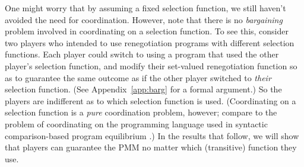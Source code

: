 \documentclass[sigconf]{aamas}
\theoremstyle{definition}
\begin{document}
One might worry that by assuming a fixed selection function,
we still haven't avoided the need for coordination. However, note that there is no \textit{bargaining} problem involved in coordinating on a selection function. To see this, consider two players who intended to use renegotiation programs with different selection functions. Each player could switch to using a program that used the other player's selection function, and modify their set-valued renegotiation function
so as to guarantee the same outcome as if the other player switched to \textit{their} selection function. (See Appendix~\ref{app:barg} for a formal argument.)
So the players are indifferent as to which selection function is used.
(Coordinating on a selection function is a \textit{pure} coordination problem, however; compare to the problem of coordinating on the programming language used in syntactic comparison-based program equilibrium \citep{tennenholtz2004program}.)
In the results that follow,
we will show that players can guarantee
the PMM no matter which
(transitive)
\selfunction{} function they use.
\end{document}

